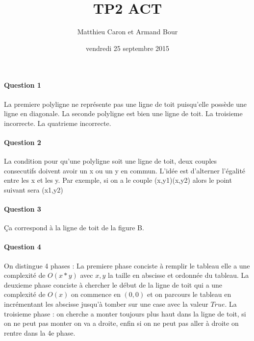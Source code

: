 \documentclass[a4paper,10pt]{article}
\title{TP2 ACT}
\author{Matthieu Caron et Armand Bour}
\date{vendredi 25 septembre 2015}
\begin{document}
\maketitle

\paragraph{Question 1}
La premiere polyligne ne représente pas une ligne de toit puisqu'elle possède une ligne en diagonale.\newline
La seconde polyligne est bien une ligne de toit.\newline
La troisieme incorrecte.\newline
La quatrieme incorrecte.\newline
\paragraph{Question 2}
La condition pour qu'une polyligne soit une ligne de toit, deux couples consecutifs doivent avoir un x ou un y en commun.
L'idée est d'alterner l'égalité entre les x et les y.
Par exemple, si on a le couple (x,y1)(x,y2) alors le point suivant sera (x1,y2) 
\paragraph{Question 3}
Ça correspond à la ligne de toit de la figure B.
\paragraph{Question 4}
On distingue 4 phases : \newline
La premiere phase conciste à remplir le tableau elle a une complexité de $O(x*y)$ avec $x,y$ la taille en abscisse et ordonnée du tableau.\newline
La deuxieme phase conciste à chercher le début de la ligne de toit qui a une complexité de $O(x)$ on commence en $(0,0)$ et 
on parcours le tableau en incrémentant les abscisse jusqu'à tomber sur une case avec la valeur $True$.
La troisieme phase : on cherche a monter toujours plus haut dans la ligne de toit, si on ne peut pas monter on va a droite, 
enfin si on ne peut pas aller à droite on rentre dans la 4e phase.
\end{document}
